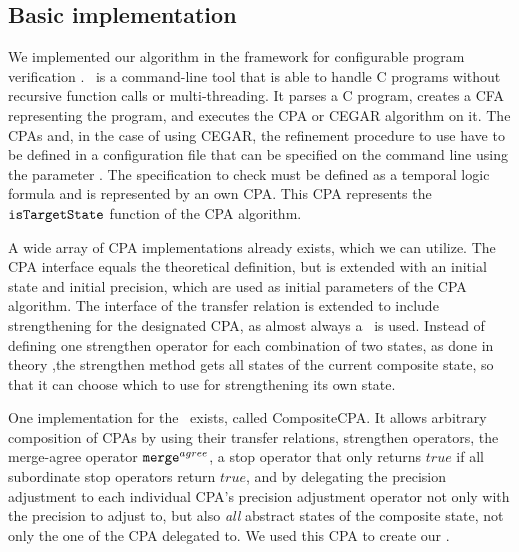 \subsection{Basic implementation}
We implemented our algorithm in the framework for configurable program verification \cpaChecker \cite{Beyer2011}.
\CpaChecker\ is a command-line tool that is able to handle C programs without recursive function calls or multi-threading.
It parses a C program, creates a CFA representing the program, and executes the CPA or CEGAR algorithm on it.
The CPAs and, in the case of using CEGAR, the refinement procedure to use have to be defined in a configuration file that can be specified on the command line using the parameter
.
The specification to check must be defined as a temporal logic formula and is represented by an own CPA.
This CPA represents the $\texttt{isTargetState}$ function of the CPA algorithm.

A wide array of CPA implementations already exists, which we can utilize.
The CPA interface equals the theoretical definition, but is extended with an initial state and initial precision, which are used as initial parameters of the CPA algorithm.
The interface of the transfer relation is extended to include strengthening for the designated CPA, as almost always a \compositeCPA\ is used.
Instead of defining one strengthen operator for each combination of two states, as done in theory ,the strengthen method gets all states of the current composite state, so that it can choose which to use for strengthening its own state.

One implementation for the \compositeCPA\ exists, called CompositeCPA.
It allows arbitrary composition of CPAs by using their transfer relations, strengthen operators, 
the merge-agree operator ${\texttt{merge}^{agree}}$, a stop operator that only returns $true$ if all subordinate stop operators return $true$,  and by delegating the precision adjustment to each individual CPA's precision adjustment operator not only with the precision to adjust to,
but also \emph{all} abstract states of the composite state, not only the one of the CPA delegated to.
We used this CPA to create our \symbolicExecutionCPA.

